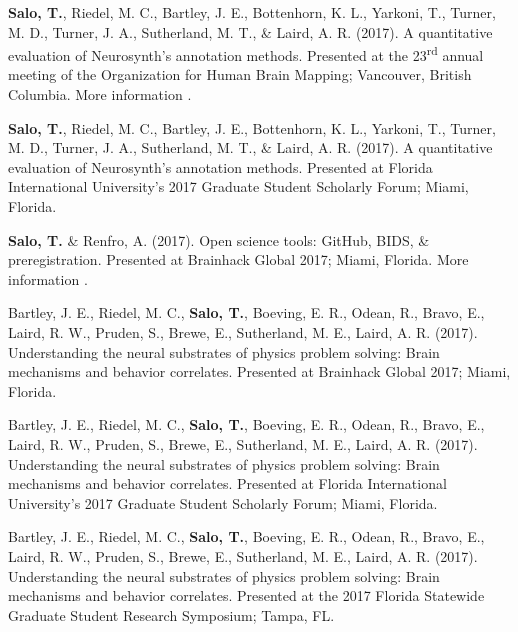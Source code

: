 \documentclass[10pt]{article}
\newcommand{\sectionstyle}{\LARGE \fontfamily{pcr}\selectfont}
\newcommand{\textlink}[3][blue]{\href{#2}{\color{#1}{#3}}}%
\begin{document}
\bigskip

\begin{center}\sectionstyle{PRESENTATIONS}\end{center}

\begin{hangparas}{.25in}{1}
\textbf{Salo, T.}, Riedel, M. C., Bartley, J. E., Bottenhorn, K. L., Yarkoni, T.,
Turner, M. D., Turner, J. A., Sutherland, M. T., \& Laird, A. R. (2017).
A quantitative evaluation of Neurosynth's annotation methods. Presented at
the 23\textsuperscript{rd} annual meeting of the Organization for Human Brain
Mapping; Vancouver, British Columbia. More information
\textlink{https://nbclab.github.io/presentations/salo-neurosynth-presentation}{here}.

\bigskip

\textbf{Salo, T.}, Riedel, M. C., Bartley, J. E., Bottenhorn, K. L., Yarkoni, T.,
Turner, M. D., Turner, J. A., Sutherland, M. T., \& Laird, A. R. (2017).
A quantitative evaluation of Neurosynth's annotation methods. Presented at
Florida International University's 2017 Graduate Student Scholarly Forum;
Miami, Florida.

\bigskip

\textbf{Salo, T.} \& Renfro, A. (2017). Open science tools: GitHub, BIDS, \&
preregistration. Presented at Brainhack Global 2017; Miami, Florida. More
information \textlink{https://osf.io/557vf}{here}.

\bigskip

Bartley, J. E., Riedel, M. C., \textbf{Salo, T.}, Boeving, E. R., Odean, R.,
Bravo, E., Laird, R. W., Pruden, S., Brewe, E., Sutherland, M. E., Laird, A. R.
(2017). Understanding the neural substrates of physics problem solving: Brain
mechanisms and behavior correlates. Presented at Brainhack Global 2017; Miami,
Florida.

\bigskip

Bartley, J. E., Riedel, M. C., \textbf{Salo, T.}, Boeving, E. R., Odean, R.,
Bravo, E., Laird, R. W., Pruden, S., Brewe, E., Sutherland, M. E., Laird, A. R.
(2017). Understanding the neural substrates of physics problem solving: Brain
mechanisms and behavior correlates. Presented at Florida International
University's 2017 Graduate Student Scholarly Forum; Miami, Florida.

\bigskip

Bartley, J. E., Riedel, M. C., \textbf{Salo, T.}, Boeving, E. R., Odean, R.,
Bravo, E., Laird, R. W., Pruden, S., Brewe, E., Sutherland, M. E., Laird, A. R.
(2017). Understanding the neural substrates of physics problem solving: Brain
mechanisms and behavior correlates. Presented at the 2017 Florida Statewide
Graduate Student Research Symposium; Tampa, FL.
\end{hangparas}
\end{document}
